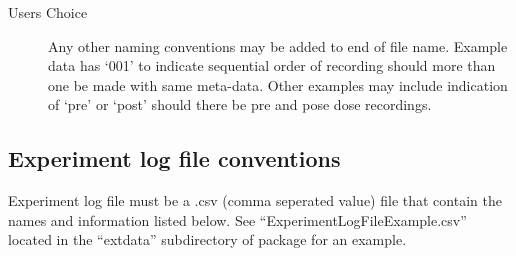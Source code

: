 \documentclass{article}\usepackage[]{graphicx}\usepackage[]{color}
\begin{document}
\begin{description}
\item[Users Choice] Any other naming conventions may be added to end of file name. Example data has `001' to indicate sequential order of recording should more than one be made with same meta-data.  Other examples may include indication of `pre' or  `post'  should there be pre and pose dose recordings.

\end{description}




\subsection*{Experiment log file conventions}
Experiment log file must be a .csv (comma seperated value) file that contain the names and information listed below.  See  ``Experiment\textunderscore LogFileExample.csv'' located in the ``extdata'' subdirectory of package for an example.
\end{document}
